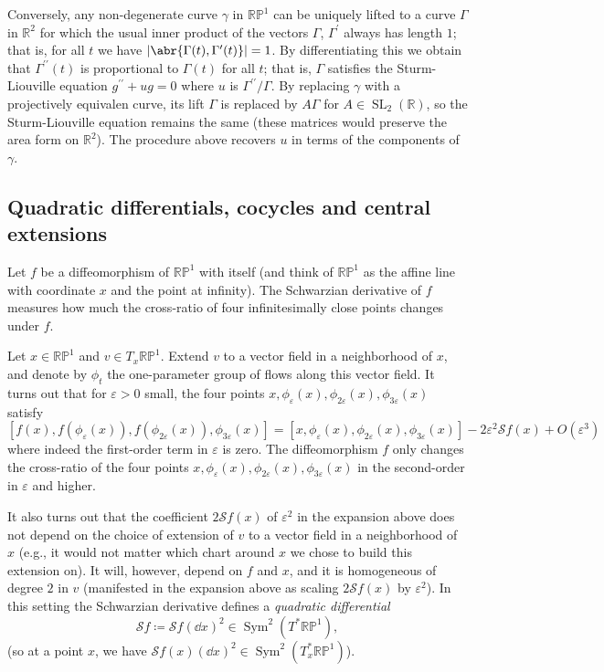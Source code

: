 \documentclass[11pt,leqno]{article}
\theoremstyle{plain}
\theoremstyle{definition}
\numberwithin{equation}{section}
\numberwithin{lem}{section}
\DeclareMathOperator{\Sym}{Sym}
\DeclareMathOperator{\SL}{SL}
\begin{document}
Conversely, any non-degenerate curve $\gamma$ in $\mathbb{RP}^1$ can be uniquely lifted to a curve $\Gamma$ in $\mathbb R^2$ for which the usual inner product of the vectors $\Gamma$, $\Gamma^\prime$ always has length $1$; that is, for all $t$ we have $\abs{\abr{\Gamma(t),\Gamma^\prime(t)}} = 1$. By differentiating this we obtain that $\Gamma^{\prime\prime}(t)$ is proportional to $\Gamma(t)$ for all $t$; that is, $\Gamma$ satisfies the Sturm-Liouville equation $g^{\prime\prime} + ug = 0$ where $u$ is $\Gamma^{\prime\prime}/\Gamma$. By replacing $\gamma$ with a projectively equivalen curve, its lift $\Gamma$ is replaced by $A\Gamma$ for $A\in \SL_2(\mathbb R)$, so the Sturm-Liouville equation remains the same (these matrices would preserve the area form on $\mathbb R^2$). The procedure above recovers $u$ in terms of the components of $\gamma$.

\newpage\subsection{Quadratic differentials, cocycles and central extensions}
Let $f$ be a diffeomorphism of $\mathbb{RP}^1$ with itself (and think of $\mathbb{RP}^1$ as the affine line with coordinate $x$ and the point at infinity). The Schwarzian derivative of $f$ measures how much the cross-ratio of four infinitesimally close points changes under $f$.

Let $x\in\mathbb{RP}^1$ and $v\in T_x\mathbb{RP}^1$. Extend $v$ to a vector field in a neighborhood of $x$, and denote by $\phi_t$ the one-parameter group of flows along this vector field. It turns out that for $\varepsilon> 0$ small, the four points $x, \phi_{\varepsilon}(x), \phi_{2\varepsilon}(x), \phi_{3\varepsilon}(x)$ satisfy 
\[[f(x),f(\phi_{\varepsilon}(x)), f(\phi_{2\varepsilon}(x)), \phi_{3\varepsilon}(x)] = [x,\phi_{\varepsilon}(x), \phi_{2\varepsilon}(x), \phi_{3\varepsilon}(x)] - 2\varepsilon^2\mathscr Sf(x) + O(\varepsilon^3)\]
where indeed the first-order term in $\varepsilon$ is zero. The diffeomorphism $f$ only changes the cross-ratio of the four points $x, \phi_{\varepsilon}(x), \phi_{2\varepsilon}(x), \phi_{3\varepsilon}(x)$ in the second-order in $\varepsilon$ and higher.

It also turns out that the coefficient $2\mathscr Sf(x)$ of $\varepsilon^2$ in the expansion above does not depend on the choice of extension of $v$ to a vector field in a neighborhood of $x$ (e.g., it would not matter which chart around $x$ we chose to build this extension on). It will, however, depend on $f$ and $x$, and it is homogeneous of degree $2$ in $v$ (manifested in the expansion above as scaling $2\mathscr Sf(x)$ by $\varepsilon^2$). In this setting the Schwarzian derivative defines a \textit{quadratic differential} 
\[\mathscr Sf \coloneqq \mathscr Sf(\dd x)^2\in \Sym^2(T^\ast\mathbb{RP}^1),\]
(so at a point $x$, we have $\mathscr Sf(x)(\dd x)^2\in \Sym^2(T^\ast_x\mathbb{RP}^1)$).
\end{document}
